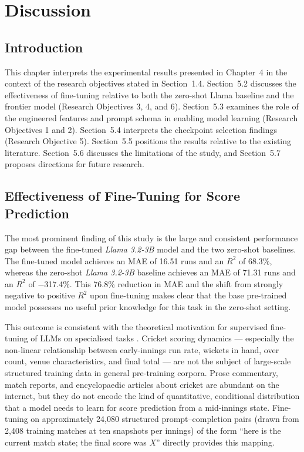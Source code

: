 \chapter{Discussion}

\section{Introduction}

This chapter interprets the experimental results presented in Chapter~4 in the context of the research objectives stated in Section~1.4. Section~5.2 discusses the effectiveness of fine-tuning relative to both the zero-shot Llama baseline and the frontier model (Research Objectives 3, 4, and 6). Section~5.3 examines the role of the engineered features and prompt schema in enabling model learning (Research Objectives 1 and 2). Section~5.4 interprets the checkpoint selection findings (Research Objective 5). Section~5.5 positions the results relative to the existing literature. Section~5.6 discusses the limitations of the study, and Section~5.7 proposes directions for future research.

\section{Effectiveness of Fine-Tuning for Score Prediction}

The most prominent finding of this study is the large and consistent performance gap between the fine-tuned \textit{Llama 3.2-3B} model and the two zero-shot baselines. The fine-tuned model achieves an MAE of 16.51 runs and an $R^2$ of 68.3\%, whereas the zero-shot \textit{Llama 3.2-3B} baseline achieves an MAE of 71.31 runs and an $R^2$ of $-$317.4\%. This 76.8\% reduction in MAE and the shift from strongly negative to positive $R^2$ upon fine-tuning makes clear that the base pre-trained model possesses no useful prior knowledge for this task in the zero-shot setting.

This outcome is consistent with the theoretical motivation for supervised fine-tuning of LLMs on specialised tasks \cite{ouyang2022training}. Cricket scoring dynamics --- especially the non-linear relationship between early-innings run rate, wickets in hand, over count, venue characteristics, and final total --- are not the subject of large-scale structured training data in general pre-training corpora. Prose commentary, match reports, and encyclopaedic articles about cricket are abundant on the internet, but they do not encode the kind of quantitative, conditional distribution that a model needs to learn for score prediction from a mid-innings state. Fine-tuning on approximately 24,080 structured prompt--completion pairs (drawn from 2,408 training matches at ten snapshots per innings) of the form ``here is the current match state; the final score was $X$'' directly provides this mapping.

